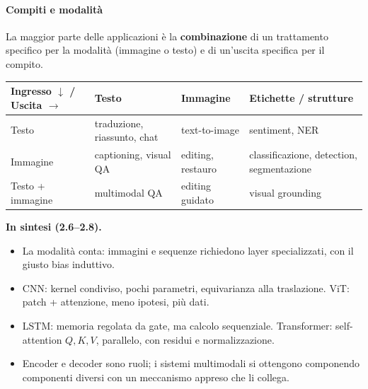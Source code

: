 \documentclass[12pt]{extarticle}
\begin{document}
\begin{center}
\end{center}

\paragraph{Compiti e modalità}
La maggior parte delle applicazioni è la \textbf{combinazione} di un trattamento specifico per la modalità (immagine o testo) e di un'uscita specifica per il compito.
\begin{center}
\footnotesize
\begin{tabular}{L{2.1cm}L{3.9cm}L{3.7cm}L{3.9cm}}
    \toprule
    \textbf{Ingresso $\downarrow$ / Uscita $\rightarrow$} & \textbf{Testo} & \textbf{Immagine} & \textbf{Etichette / strutture} \\
    \midrule
    Testo & traduzione, riassunto, chat & text-to-image & sentiment, NER \\
    Immagine & captioning, visual QA & editing, restauro & classificazione, detection, segmentazione \\
    Testo + immagine & multimodal QA & editing guidato & visual grounding \\
    \bottomrule
\end{tabular}
\end{center}

\noindent\textbf{In sintesi (2.6--2.8).}
\begin{itemize}
    \item La modalità conta: immagini e sequenze richiedono layer specializzati, con il giusto bias induttivo.
    \item CNN: kernel condiviso, pochi parametri, equivarianza alla traslazione. ViT: patch + attenzione, meno ipotesi, più dati.
    \item LSTM: memoria regolata da gate, ma calcolo sequenziale. Transformer: self-attention $Q,K,V$, parallelo, con residui e normalizzazione.
    \item Encoder e decoder sono ruoli; i sistemi multimodali si ottengono componendo componenti diversi con un meccanismo appreso che li collega.
\end{itemize}
\end{document}
